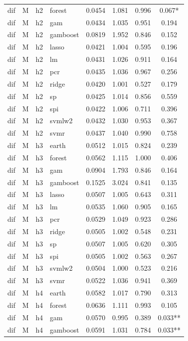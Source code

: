 \begin{ThreePartTable}
\begin{longtable}[t]{llclcccc}
dif & M & h2 & forest & 0.0454 & 1.081 & 0.996 & 0.067*\\
dif & M & h2 & gam & 0.0434 & 1.035 & 0.951 & 0.194\\
dif & M & h2 & gamboost & 0.0819 & 1.952 & 0.846 & 0.152\\
dif & M & h2 & lasso & 0.0421 & 1.004 & 0.595 & 0.196\\
dif & M & h2 & lm & 0.0431 & 1.026 & 0.911 & 0.164\\
dif & M & h2 & pcr & 0.0435 & 1.036 & 0.967 & 0.256\\
dif & M & h2 & ridge & 0.0420 & 1.001 & 0.527 & 0.179\\
dif & M & h2 & sp & 0.0425 & 1.014 & 0.856 & 0.559\\
dif & M & h2 & spi & 0.0422 & 1.006 & 0.711 & 0.396\\
dif & M & h2 & svmlw2 & 0.0432 & 1.030 & 0.953 & 0.367\\
dif & M & h2 & svmr & 0.0437 & 1.040 & 0.990 & 0.758\\
\addlinespace
dif & M & h3 & earth & 0.0512 & 1.015 & 0.824 & 0.239\\
dif & M & h3 & forest & 0.0562 & 1.115 & 1.000 & 0.406\\
dif & M & h3 & gam & 0.0904 & 1.793 & 0.846 & 0.164\\
dif & M & h3 & gamboost & 0.1525 & 3.024 & 0.841 & 0.135\\
dif & M & h3 & lasso & 0.0507 & 1.005 & 0.643 & 0.311\\
dif & M & h3 & lm & 0.0535 & 1.060 & 0.905 & 0.165\\
dif & M & h3 & pcr & 0.0529 & 1.049 & 0.923 & 0.286\\
dif & M & h3 & ridge & 0.0505 & 1.002 & 0.548 & 0.231\\
dif & M & h3 & sp & 0.0507 & 1.005 & 0.620 & 0.305\\
dif & M & h3 & spi & 0.0505 & 1.002 & 0.563 & 0.267\\
dif & M & h3 & svmlw2 & 0.0504 & 1.000 & 0.523 & 0.216\\
dif & M & h3 & svmr & 0.0522 & 1.036 & 0.941 & 0.369\\
\addlinespace
dif & M & h4 & earth & 0.0582 & 1.017 & 0.790 & 0.313\\
dif & M & h4 & forest & 0.0636 & 1.111 & 0.993 & 0.105\\
dif & M & h4 & gam & 0.0570 & 0.995 & 0.389 & 0.033**\\
dif & M & h4 & gamboost & 0.0591 & 1.031 & 0.784 & 0.033**\\

\end{longtable}
\end{ThreePartTable}
